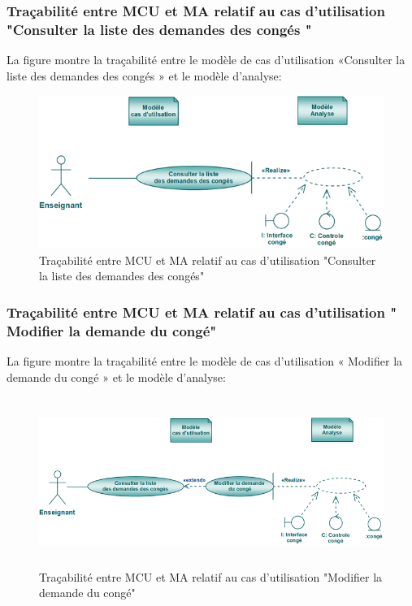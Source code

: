 \documentclass[12 pt ]{report}
\begin{document}
\subsubsection{Traçabilité entre MCU et MA relatif au cas d’utilisation "Consulter la liste des demandes des congés " }
La figure  montre la traçabilité entre le modèle de cas d’utilisation «Consulter la liste des demandes des congés » et le modèle d’analyse:

\begin{figure}[h]
\begin{center}
\includegraphics[width= 14cm , height =5cm]{tcc.PNG}
\caption{Traçabilité entre MCU et MA relatif au cas d’utilisation "Consulter la liste des demandes des congés"}
\end{center}
\end{figure}

\subsubsection{Traçabilité entre MCU et MA relatif au cas d’utilisation " Modifier la demande du congé" }
La figure  montre la traçabilité entre le modèle de cas d’utilisation « Modifier la demande du congé » et le modèle d’analyse:

\begin{figure}[h]
\begin{center}
\includegraphics[width= 14cm , height =5.5cm]{tmc.PNG}
\caption{Traçabilité entre MCU et MA relatif au cas d’utilisation "Modifier la demande du congé"}
\end{center}
\end{figure}
\end{document}
